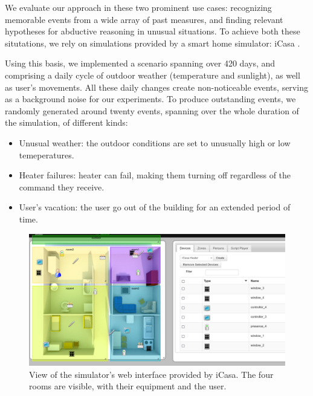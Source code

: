 \documentclass[conference]{IEEEtran}
\begin{document}
We evaluate our approach in these two prominent use cases: recognizing memorable events from a wide array of past measures, and finding relevant hypotheses for abductive reasoning in unusual situations. To achieve both these situtations, we rely on simulations provided by a smart home simulator: iCasa \cite{lalanda_self-aware_2017}.

Using this basis, we implemented a scenario spanning over 420 days, and comprising a daily cycle of outdoor weather (temperature and sunlight), as well as user's movements. All these daily changes create non-noticeable events, serving as a background noise for our experiments. To produce outstanding events, we randomly generated around twenty events, spanning over the whole duration of the simulation, of different kinds:
\begin{itemize}
    \item Unusual weather: the outdoor conditions are set to unusually high or low temeperatures.
    \item Heater failures: heater can fail, making them turning off regardless of the command they receive.
    \item User's vacation: the user go out of the building for an extended period of time.
\end{itemize}
\begin{figure}[ht]
  \centering
  \includegraphics[width=\linewidth]{figures/simulator}
  \caption{View of the simulator's web interface provided by iCasa. The four rooms are visible, with their equipment and the user.}
  \label{fig:view}
\end{figure}
\end{document}

